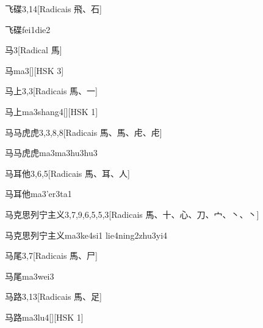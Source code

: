 \begin{entry}{飞碟}{3,14}[Radicais ⾶、⽯]
  \begin{phonetics}{飞碟}{fei1die2}
  \end{phonetics}
\end{entry}

\begin{entry}{马}{3}[Radical ⾺]
  \begin{phonetics}{马}{ma3}[][HSK 3]
  \end{phonetics}
\end{entry}

\begin{entry}{马上}{3,3}[Radicais ⾺、⼀]
  \begin{phonetics}{马上}{ma3shang4}[][HSK 1]
  \end{phonetics}
\end{entry}

\begin{entry}{马马虎虎}{3,3,8,8}[Radicais ⾺、⾺、⾌、⾌]
  \begin{phonetics}{马马虎虎}{ma3ma3hu3hu3}
  \end{phonetics}
\end{entry}

\begin{entry}{马耳他}{3,6,5}[Radicais ⾺、⽿、⼈]
  \begin{phonetics}{马耳他}{ma3'er3ta1}
  \end{phonetics}
\end{entry}

\begin{entry}{马克思列宁主义}{3,7,9,6,5,5,3}[Radicais ⾺、⼗、⼼、⼑、⼧、⼂、⼂]
  \begin{phonetics}{马克思列宁主义}{ma3ke4si1 lie4ning2zhu3yi4}
  \end{phonetics}
\end{entry}

\begin{entry}{马尾}{3,7}[Radicais ⾺、⼫]
  \begin{phonetics}{马尾}{ma3wei3}
  \end{phonetics}
\end{entry}

\begin{entry}{马路}{3,13}[Radicais ⾺、⾜]
  \begin{phonetics}{马路}{ma3lu4}[][HSK 1]
  \end{phonetics}
\end{entry}


